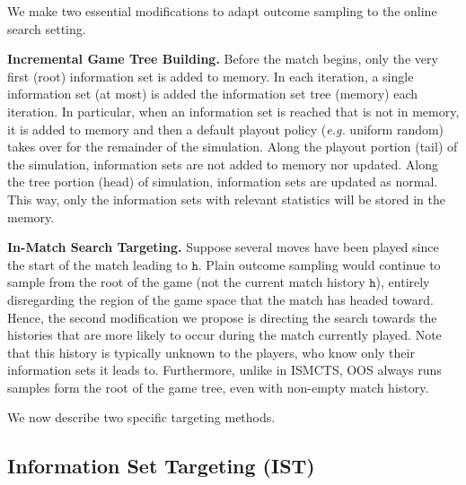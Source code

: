 \documentclass[letterpaper]{article}
\newcommand{\tth}{\mathtt{h}}
\newcommand{\defword}[1]{\textbf{\boldmath{#1}}}
\newcommand{\eg}{{\it e.g.}\xspace}
\begin{document}
We make two essential modifications to adapt outcome sampling to the online search setting.

{\bf Incremental Game Tree Building.} Before the match begins, only the very first (root) information set is added to memory. 
In each iteration, a single information set (at most) is added the information set tree (memory) each iteration.
In particular, when an information set is reached that is not in memory, it is added to memory and then a default 
playout policy (\eg uniform random) takes over for the remainder of the simulation.
Along the playout portion (tail) of the simulation, information sets are not added to memory nor updated.
Along the tree portion (head) of simulation, information sets are updated as normal. 
This way, only the information sets with relevant statistics will be stored in the memory.

{\bf In-Match Search Targeting.}
Suppose several moves have been played since the start of the match leading to $\tth$. 
Plain outcome sampling would continue to sample from the root of the game (not the current match history $\tth$), entirely 
disregarding the region of the game space that the match has headed toward. 
Hence, the second modification we propose is directing the search towards the histories that are more likely to occur during the match currently played.
Note that this history is typically unknown to the players, who know only their information sets it leads to. 
Furthermore, unlike in ISMCTS, OOS always runs samples form the root of the game tree, even with non-empty match history.

We now describe two specific targeting methods.

\subsection{Information Set Targeting (IST)}
\end{document}
